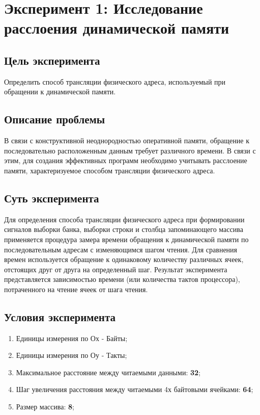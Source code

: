 \chapter{Эксперимент 1: Исследование расслоения динамической памяти}

\section{Цель эксперимента}
Определить способ трансляции физического адреса, используемый при обращении к динамической памяти.  

\section{Описание проблемы}
В связи с конструктивной неоднородностью  оперативной памяти,  обращение к последовательно расположенным данным  требует различного времени. В связи с этим, для создания эффективных программ необходимо учитывать расслоение памяти, характеризуемое способом трансляции физического адреса. 

\section{Суть эксперимента}
Для определения способа трансляции физического адреса при формировании сигналов выборки банка, выборки строки и столбца запоминающего массива применяется процедура замера времени обращения к динамической памяти по последовательным адресам с изменяющимся шагом чтения. Для сравнения времен используется обращение к одинаковому количеству различных ячеек,  отстоящих друг от друга  на  определенный шаг. Результат эксперимента представляется зависимостью  времени (или количества тактов процессора), потраченного на чтение ячеек от шага чтения. 

\section{Условия эксперимента}
\begin{enumerate}
    \item Единицы измерения по Ох - Байты;
    \item Единицы измерения по Оу - Такты;
    \item Максимальное расстояние между читаемыми данными: \textbf{32};
    \item Шаг увеличения расстояния между читаемыми 4х байтовыми ячейками: \textbf{64};
    \item Размер массива: \textbf{8};
\end{enumerate}

